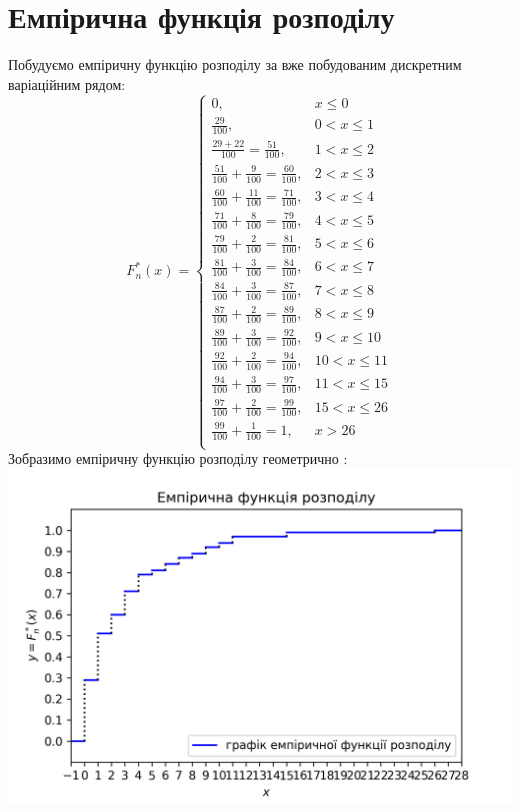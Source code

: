 \documentclass{article}
\begin{document}
\section{Емпірична функція розподілу}
Побудуємо емпіричну функцію розподілу за вже побудованим 
дискретним варіаційним рядом:
\newline
$$F_n^*(x) = \begin{cases}
  0,  & x \leq 0 \\
  \frac{29}{100}, & 0 < x \leq 1 \\
  \frac{29 + 22}{100} = \frac{51}{100}, & 1 < x \leq 2 \\
  \frac{51}{100} + \frac{9}{100} = \frac{60}{100}, & 2 < x \leq 3 \\
  \frac{60}{100} + \frac{11}{100} = \frac{71}{100}, & 3 < x \leq 4 \\
  \frac{71}{100} + \frac{8}{100} = \frac{79}{100}, & 4 < x \leq 5 \\
  \frac{79}{100} + \frac{2}{100} = \frac{81}{100}, & 5 < x \leq 6 \\
  \frac{81}{100} + \frac{3}{100} = \frac{84}{100}, & 6 < x \leq 7 \\
  \frac{84}{100} + \frac{3}{100} = \frac{87}{100}, & 7 < x \leq 8 \\
  \frac{87}{100} + \frac{2}{100} = \frac{89}{100}, & 8 < x \leq 9 \\
  \frac{89}{100} + \frac{3}{100} = \frac{92}{100}, & 9 < x \leq 10 \\
  \frac{92}{100} + \frac{2}{100} = \frac{94}{100}, & 10 < x \leq 11 \\
  \frac{94}{100} + \frac{3}{100} = \frac{97}{100}, & 11 < x \leq 15 \\
  \frac{97}{100} + \frac{2}{100} = \frac{99}{100}, & 15 < x \leq 26 \\
  \frac{99}{100} + \frac{1}{100} = 1, & x > 26 \\
\end{cases}$$
\newpage
Зобразимо емпіричну функцію розподілу геометрично :
\newline
\includegraphics[scale = 0.8]{func}
\end{document}
